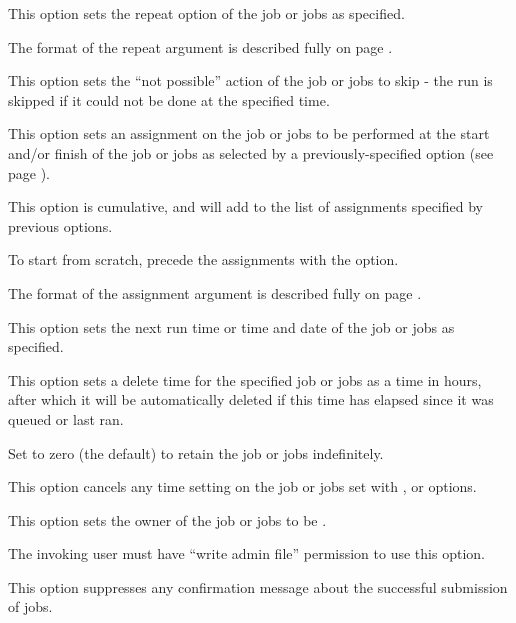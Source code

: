 
This option sets the repeat option of the job or jobs as specified.

The format of the repeat argument is described fully on page \pageref{btr:repeatfmt}.


This option sets the ``not possible'' action of the job or jobs to skip - the run is skipped if it could not be done at the specified
time.


This option sets an assignment on the job or jobs to be performed at the start and/or finish of the job or jobs as selected by a
previously-specified  option (see page \pageref{btr:assflags}).

This option is cumulative, and will add to the list of assignments specified by previous  options.

To start from scratch, precede the assignments with the  option.

The format of the assignment argument is described fully on page \pageref{btr:assfmt}.


This option sets the next run time or time and date of the job or jobs as specified.


This option sets a delete time for the specified job or jobs as a time in hours, after which it will be automatically deleted if this time has
elapsed since it was queued or last ran.

Set to zero (the default) to retain the job or jobs indefinitely.


This option cancels any time setting on the job or jobs set with ,  or  options.


This option sets the owner of the job or jobs to be .

The invoking user must have ``write admin file'' permission to use this option.


This option suppresses any confirmation message about the successful submission of jobs.

